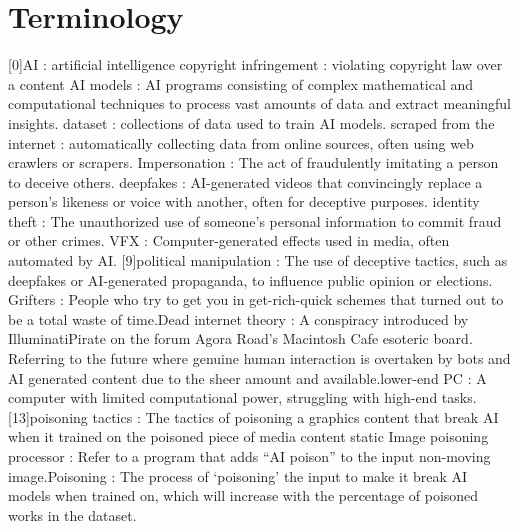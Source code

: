 \section{Terminology}
\label{section:terminology}

[0]AI : artificial intelligence \newline
[1]copyright infringement : violating copyright law over a content \newline 
[2]AI models : AI programs consisting of complex mathematical and computational techniques to process vast amounts of data and extract meaningful insights. \newline
[3]dataset : collections of data used to train AI models. \newline
[4]scraped from the internet : automatically collecting data from online sources, often using web crawlers or scrapers. \newline
[5]Impersonation : The act of fraudulently imitating a person to deceive others. \newline
[6]deepfakes : AI-generated videos that convincingly replace a person’s likeness or voice with another, often for deceptive purposes. \newline
[7]identity theft : The unauthorized use of someone’s personal information to commit fraud or other crimes. \newline
[8]VFX : Computer-generated effects used in media, often automated by AI.
[9]political manipulation : The use of deceptive tactics, such as deepfakes or AI-generated propaganda, to influence public opinion or elections. \newline
[10]Grifters : People who try to get you in get-rich-quick schemes that turned out to be a total waste of time.\newline
[11]Dead internet theory : A conspiracy introduced by IlluminatiPirate on the forum Agora Road's Macintosh Cafe esoteric board. Referring to the future where genuine human interaction is overtaken by bots and AI generated content due to the sheer amount and available.\newline
[12]lower-end PC : A computer with limited computational power, struggling with high-end tasks.
[13]poisoning tactics : The tactics of poisoning a graphics content that break AI when it trained on the poisoned piece of media content \newline
[14]static Image poisoning processor : Refer to a program that adds “AI poison” to the input non-moving image.\newline
[15]Poisoning : The process of ‘poisoning’ the input to make it break AI models when trained on, which will increase with the percentage of poisoned works in the dataset.\newline
